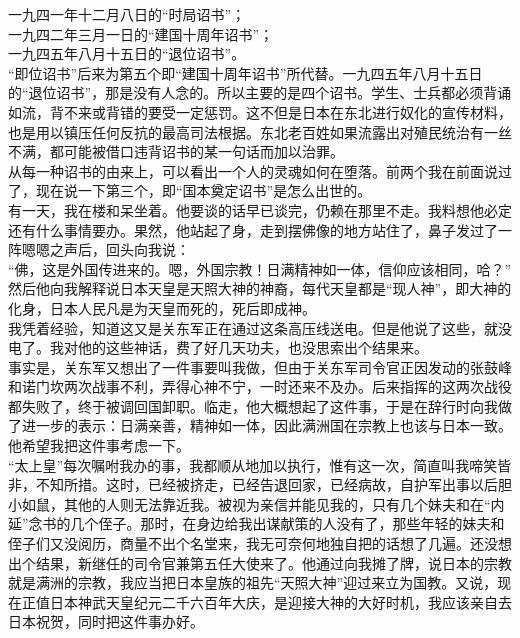 一九四一年十二月八日的“时局诏书”；\\

一九四二年三月一日的“建国十周年诏书”；\\

一九四五年八月十五日的“退位诏书”。\\

“即位诏书”后来为第五个即“建国十周年诏书”所代替。一九四五年八月十五日的“退位诏书”，那是没有人念的。所以主要的是四个诏书。学生、士兵都必须背诵如流，背不来或背错的要受一定惩罚。这不但是日本在东北进行奴化的宣传材料，也是用以镇压任何反抗的最高司法根据。东北老百姓如果流露出对殖民统治有一丝不满，都可能被借口违背诏书的某一句话而加以治罪。\\

从每一种诏书的由来上，可以看出一个人的灵魂如何在堕落。前两个我在前面说过了，现在说一下第三个，即“国本奠定诏书”是怎么出世的。\\

有一天，我在楼和呆坐着。他要谈的话早已谈完，仍赖在那里不走。我料想他必定还有什么事情要办。果然，他站起了身，走到摆佛像的地方站住了，鼻子发过了一阵嗯嗯之声后，回头向我说：\\

“佛，这是外国传进来的。嗯，外国宗教！日满精神如一体，信仰应该相同，哈？”\\

然后他向我解释说日本天皇是天照大神的神裔，每代天皇都是“现人神”，即大神的化身，日本人民凡是为天皇而死的，死后即成神。\\

我凭着经验，知道这又是关东军正在通过这条高压线送电。但是他说了这些，就没电了。我对他的这些神话，费了好几天功夫，也没思索出个结果来。\\

事实是，关东军又想出了一件事要叫我做，但由于关东军司令官正因发动的张鼓峰和诺门坎两次战事不利，弄得心神不宁，一时还来不及办。后来指挥的这两次战役都失败了，终于被调回国卸职。临走，他大概想起了这件事，于是在辞行时向我做了进一步的表示：日满亲善，精神如一体，因此满洲国在宗教上也该与日本一致。他希望我把这件事考虑一下。\\

“太上皇”每次嘱咐我办的事，我都顺从地加以执行，惟有这一次，简直叫我啼笑皆非，不知所措。这时，已经被挤走，已经告退回家，已经病故，自护军出事以后胆小如鼠，其他的人则无法靠近我。被视为亲信并能见我的，只有几个妹夫和在“内延”念书的几个侄子。那时，在身边给我出谋献策的人没有了，那些年轻的妹夫和侄子们又没阅历，商量不出个名堂来，我无可奈何地独自把的话想了几遍。还没想出个结果，新继任的司令官兼第五任大使来了。他通过向我摊了牌，说日本的宗教就是满洲的宗教，我应当把日本皇族的祖先“天照大神”迎过来立为国教。又说，现在正值日本神武天皇纪元二千六百年大庆，是迎接大神的大好时机，我应该亲自去日本祝贺，同时把这件事办好。\\

